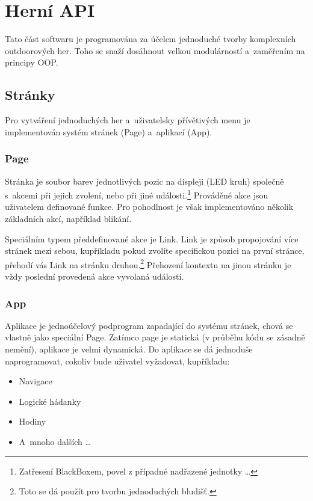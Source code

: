 \chapter{Herní API}
Tato část softwaru je programována za účelem jednoduché tvorby komplexních outdoorových her.
Toho se snaží dosáhnout velkou modulárností a~zaměřením na principy OOP.

\section{Stránky}

Pro vytváření jednoduchých her a~uživatelsky přívětivých menu je implementován systém stránek (Page) a~aplikací (App).

\subsection{Page}

Stránka je soubor barev jednotlivých pozic na displeji (LED kruh) společně s~akcemi při jejich zvolení, nebo při jiné události.\footnote{Zatřesení BlackBoxem, povel z případné nadřazené jednotky \dots}
Prováděné akce jsou uživatelem definované funkce.
Pro pohodlnost je však implementováno několik základních akcí, například blikání.

Speciálním typem předdefinované akce je Link.
Link je způsob propojování více stránek mezi sebou, kupříkladu pokud zvolíte specifickou pozici na první stránce, přehodí vás Link na stránku druhou.\footnote{Toto se dá použít pro tvorbu jednoduchých bludišť.}
Přehození kontextu na jinou stránku je vždy poslední provedená akce vyvolaná událostí.

\subsection{App}

Aplikace je jednoúčelový podprogram zapadající do systému stránek, chová se vlastně jako speciální Page.
Zatímco page je statická (v průběhu kódu se zásadně nemění), aplikace je velmi dynamická.
Do aplikace se dá jednoduše naprogramovat, cokoliv bude uživatel vyžadovat, kupříkladu:
\begin{itemize}
    \item Navigace
    \item Logické hádanky
    \item Hodiny
    \item A~mnoho dalších \dots
\end{itemize}

